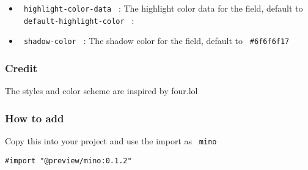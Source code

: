 \begin{Shaded}
\begin{Highlighting}[]
\NormalTok{)}
\end{Highlighting}
\end{Shaded}

\begin{itemize}
\tightlist
\item
  \texttt{\ highlight-color-data\ } : The highlight color data for the
  field, default to \texttt{\ default-highlight-color\ } :
\end{itemize}

\begin{Shaded}
\begin{Highlighting}[]
\NormalTok{)}
\end{Highlighting}
\end{Shaded}

\begin{itemize}
\tightlist
\item
  \texttt{\ shadow-color\ } : The shadow color for the field, default to
  \texttt{\ \#6f6f6f17\ }
\end{itemize}

\subsubsection{Credit}\label{credit}

The styles and color scheme are inspired by four.lol

\subsubsection{How to add}\label{how-to-add}

Copy this into your project and use the import as \texttt{\ mino\ }

\begin{verbatim}
#import "@preview/mino:0.1.2"
\end{verbatim}

